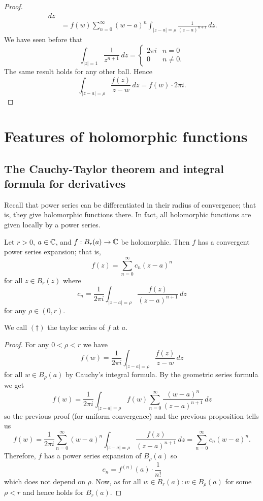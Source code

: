 \begin{proof}
\begin{align*}
            \,dz \\
        &= f(w) \sum_{n = 0}^\infty (w - a)^n 
            \int_{\lvert z - a \rvert = \rho}
            \frac1{(z-a)^{n+1}} \,dz.
    \end{align*}
    We have seen before that
    \[
        \int_{\lvert z \rvert = 1} \frac{1}{z^{n+1}} \,dz =
        \begin{cases}
            2\pi i & n = 0 \\
            0 & n \neq 0.
        \end{cases}
    \]
    The same result holds for any other ball.
    Hence
    \[
        \int_{\lvert z - a \rvert = \rho} \frac{f(z)}{z - w} \,dz = f(w) \cdot 2\pi i.
    \]
\end{proof}

\chapter{Features of holomorphic functions}
\section{The Cauchy-Taylor theorem and integral formula for derivatives}

Recall that power series can be differentiated in their radius of convergence;
that is, they give holomorphic functions there.
In fact, all holomorphic functions are given locally by a power series.

\begin{theorem}
    Let $r > 0$, $a \in \mathbb{C}$, and $f: B_r(a) \to \mathbb{C}$ be holomorphic.
    Then $f$ has a convergent power series expansion; that is,
    \[
        f(z) = \sum^{\infty}_{n = 0} c_n (z - a)^n \tag{$\dagger$}
    \]
    for all $z \in B_r(z)$ where
    \[
        c_n = \frac{1}{2\pi i}    
        \int_{\lvert z - a \rvert = \rho}
        \frac{f(z)}{(z - a)^{n + 1}} \,dz
    \]
    for any $\rho \in (0,r)$.
\end{theorem}

We call $(\dagger)$ the taylor series of $f$ at $a$.

\begin{proof}
    For any $0 < \rho < r$ we have
    \[
        f(w) = \frac{1}{2\pi i} \int_{\lvert z - a \rvert = \rho}
        \frac{f(z)}{z - w} \,dz
    \]
    for all $w \in B_{\rho}(a)$
    by Cauchy's integral formula.
    By the geometric series formula we get
    \[
        f(w) = \frac{1}{2\pi i} \int_{\lvert z - a \rvert = \rho}
        f(w) \sum^{\infty}_{n = 0} \frac{(w - a)^n}{(z - a)^{n + 1}} \,dz 
    \]
    so the previous proof (for uniform convergence) and the previous
    proposition tells us
    \[
        f(w) = \frac{1}{2\pi i} \sum^{\infty}_{n = 0} (w - a)^n
        \int_{\lvert z - a \rvert = \rho} \frac{f(z)}{(z - a)^{n + 1}} \,dz
        = \sum^{\infty}_{n = 0} c_n (w-a)^n.
    \]
    Therefore, $f$ has a power series expansion of $B_{\rho}(a)$ so
    \[
        c_n = f^{(n)}(a) \cdot \frac1{n!}
    \]
    which does not depend on $\rho$.
    Now, as for all $w \in B_r(a): w \in B_{\rho}(a)$ for some $\rho < r$
    and hence holds for $B_r(a)$.
\end{proof}
